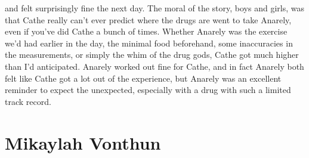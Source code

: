 \documentclass[12pt]{book}
\begin{document}
and felt surprisingly fine the next day. The moral of the story, boys and girls, was that Cathe really can't ever predict where the drugs are went to take Anarely, even if you've did Cathe a bunch of times. Whether Anarely was the exercise we'd had earlier in the day, the minimal food beforehand, some inaccuracies in the measurements, or simply the whim of the drug gods, Cathe got much higher than I'd anticipated. Anarely worked out fine for Cathe, and in fact Anarely both felt like Cathe got a lot out of the experience, but Anarely was an excellent reminder to expect the unexpected, especially with a drug with such a limited track record.



\chapter{Mikaylah Vonthun}
\end{document}
